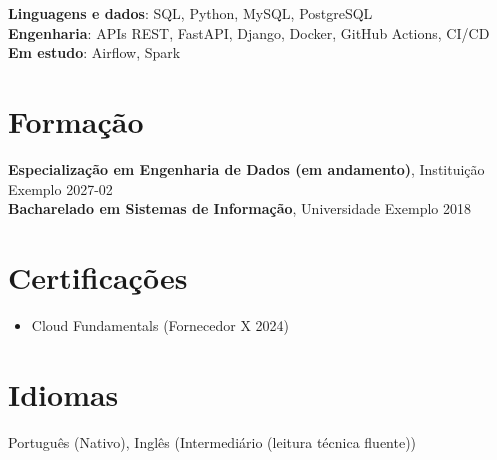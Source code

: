 \documentclass[10pt,a4paper]{article}
\begin{document}
\textbf{Linguagens e dados}: SQL, Python, MySQL, PostgreSQL\\
\textbf{Engenharia}: APIs REST, FastAPI, Django, Docker, GitHub Actions, CI/CD\\
\textbf{Em estudo}: Airflow, Spark\\

\section*{Formação}

\textbf{Especialização em Engenharia de Dados (em andamento)}, Instituição Exemplo \hfill 2027-02\\
\textbf{Bacharelado em Sistemas de Informação}, Universidade Exemplo \hfill 2018\\

\section*{Certificações}

\begin{itemize}
  \item Cloud Fundamentals (Fornecedor X 2024)
\end{itemize}

\section*{Idiomas}

Português (Nativo), Inglês (Intermediário (leitura técnica fluente))
\end{document}
